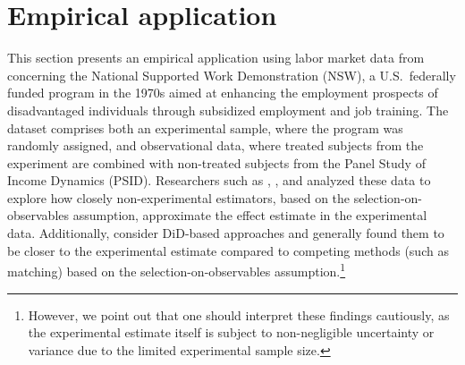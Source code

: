 {\section{Empirical application}\label{application}
		
This section presents an empirical application using labor market data from \cite{LaLonde86} concerning the National Supported Work Demonstration (NSW), a U.S.\ federally funded program in the 1970s aimed at enhancing the employment prospects of disadvantaged individuals through subsidized employment and job training. The dataset comprises both an experimental sample, where the program was randomly assigned, and observational data, where treated subjects from the experiment are combined with non-treated subjects from the Panel Study of Income Dynamics (PSID). Researchers such as \cite{LaLonde86}, \cite{DehejiaWahba99}, and \cite{DeWa02} analyzed these data to explore how closely non-experimental estimators, based on the selection-on-observables assumption, approximate the effect estimate in the experimental data. Additionally, \cite{SmithTodd00} consider DiD-based approaches and generally found them to be closer to the experimental estimate compared to competing methods (such as matching) based on the selection-on-observables assumption.\footnote{However, we point out that one should interpret these findings cautiously, as the experimental estimate itself is subject to non-negligible uncertainty or variance due to the limited experimental sample size.}

}

